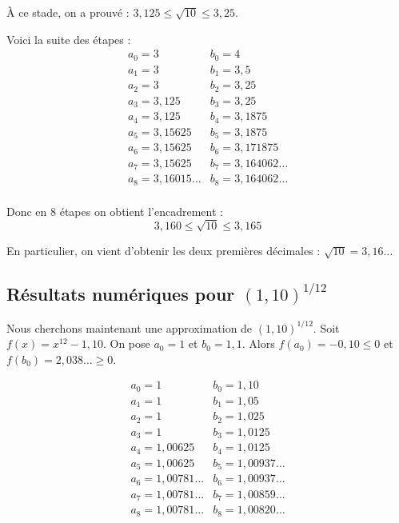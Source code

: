 \documentclass[class=report,crop=false]{standalone}
\begin{document}
\`A ce stade, on a prouvé : $3,125 \le \sqrt{10} \le 3,25$.

Voici la suite des étapes :
$$
\begin{array}{ll}
  a_0 = 3      & b_0 = 4 \\
  a_1 = 3      & b_1 = 3,5 \\
  a_2 = 3      & b_2 = 3,25 \\
  a_3 = 3,125  & b_3 = 3,25 \\
  a_4 = 3,125  & b_4 = 3,1875 \\
  a_5 = 3,15625 & b_5 = 3,1875 \\
  a_6 = 3,15625 & b_6 = 3,171875 \\
  a_7 = 3,15625 & b_7 = 3,164062\ldots \\
  a_8 = 3,16015\ldots & b_8 = 3,164062\ldots \\
\end{array}
$$

Donc en $8$ étapes on obtient l'encadrement :
$$3,160  \le \sqrt{10} \le 3,165$$

En particulier, on vient d'obtenir les deux premières décimales :
$\sqrt{10}=3,16\ldots$





\subsection{Résultats numériques pour $(1,10)^{1/12}$}


Nous cherchons maintenant une approximation de $(1,10)^{1/12}$.
Soit $f(x) = x^{12} - 1,10$.
On pose $a_0=1$ et $b_0=1,1$. Alors $f(a_0)=-0,10 \le 0$ et $f(b_0)=2,038\ldots \ge 0$.

$$
\begin{array}{ll}
  a_0 = 1             & b_0 = 1,10 \\
  a_1 = 1             & b_1 = 1,05 \\
  a_2 = 1             & b_2 = 1,025 \\
  a_3 = 1             & b_3 = 1,0125 \\
  a_4 = 1,00625       & b_4 = 1,0125 \\
  a_5 = 1,00625       & b_5 = 1,00937\ldots\\
  a_6 = 1,00781\ldots & b_6 = 1,00937\ldots \\
  a_7 = 1,00781\ldots & b_7 = 1,00859\ldots \\
  a_8 = 1,00781\ldots & b_8 = 1,00820\ldots \\
\end{array}
$$
\end{document}
